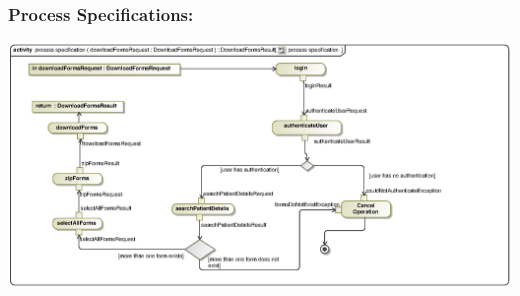\subsubsection{Process Specifications:} 
\includegraphics[width=1\linewidth]{./Graphics/FormUseCaseDiagrams/processspecification_DownloadForms}





